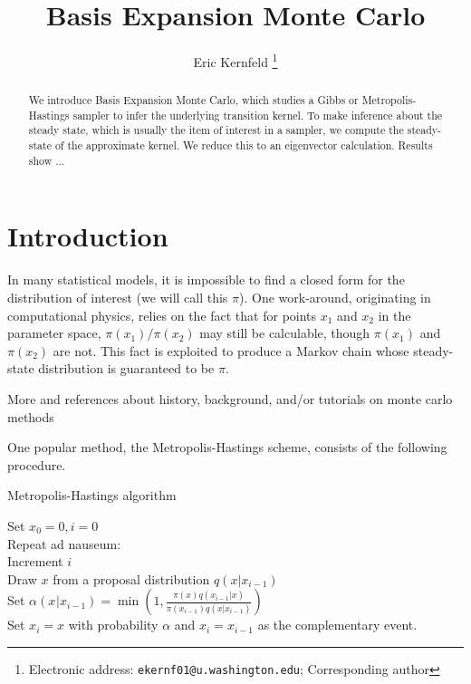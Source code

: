 \documentclass{article}
\begin{document}
\title{Basis Expansion Monte Carlo}

\author{Eric Kernfeld
  \thanks{Electronic address: \texttt{ekernf01@u.washington.edu}; Corresponding author}}
\maketitle

\begin{abstract}
We introduce Basis Expansion Monte Carlo, which studies a Gibbs or Metropolis-Hastings sampler to infer the underlying transition kernel. To make inference about the steady state, which is usually the item of interest in a sampler, we compute the steady-state of the approximate kernel. We reduce this to an eigenvector calculation. Results show ...
\end{abstract}


\section{Introduction}
In many statistical models, it is impossible to find a closed form for the distribution of interest (we will call this $\pi$). One work-around, originating in computational physics, relies on the fact that for points $x_1$ and $x_2$ in the parameter space, $\pi(x_1)/\pi(x_2)$ may still be calculable, though $\pi(x_1)$ and $\pi(x_2)$ are not. This fact is exploited to produce a Markov chain whose steady-state distribution is guaranteed to be $\pi$. 

More and references about history, background, and/or tutorials on monte carlo methods



One popular method, the Metropolis-Hastings scheme, consists of the following procedure.

\begin{algorithm}[h]
\caption{Metropolis-Hastings algorithm}
Set $x_0 = 0, i=0$\\
Repeat ad nauseum:\\
\Indp
Increment $i$\\
Draw $x$ from a proposal distribution $q(x|x_{i-1})$\\
Set $\alpha(x_{}|x_{i-1}) = \min(1, \frac{\pi(x)q(x_{i-1}|x)}{\pi(x_{i-1})q(x|x_{i-1})})$\\
Set $x_i = x$ with probability $\alpha$ and $x_i = x_{i-1}$ as the complementary event.\\
\end{algorithm}
\end{document}
